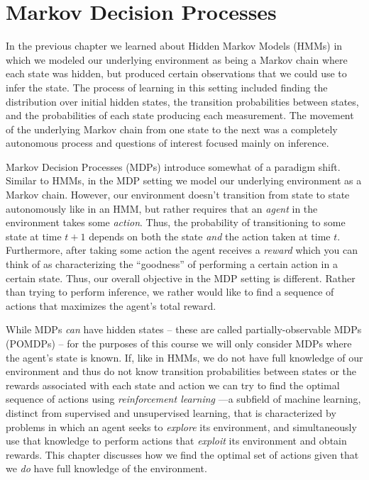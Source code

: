 \chapter{Markov Decision Processes}
In the previous chapter we learned about Hidden Markov Models (HMMs) in which we modeled our underlying environment as being a Markov chain where each state was hidden, but produced certain observations that we could use to infer the state. The process of learning in this setting included finding the distribution over initial hidden states, the transition probabilities between states, and the probabilities of each state producing each measurement. The movement of the underlying Markov chain from one state to the next was a completely autonomous process and questions of interest focused mainly on inference.

Markov Decision Processes (MDPs) introduce somewhat of a paradigm shift. Similar to HMMs, in the MDP setting we model our underlying environment as a Markov chain. However, our environment doesn't transition from state to state autonomously like in an HMM, but rather requires that an \textit{agent} in the environment takes some \textit{action}. Thus, the probability of transitioning to some state at time $t + 1$ depends on both the state \textit{and} the action taken at time $t$. Furthermore, after taking some action the agent receives a \textit{reward} which you can think of as characterizing the ``goodness'' of performing a certain action in a certain state. Thus, our overall objective in the MDP setting is different. Rather than trying to perform inference, we rather would like to find a sequence of actions that maximizes the agent's total reward.

While MDPs \textit{can} have hidden states -- these are called partially-observable MDPs (POMDPs) -- for the purposes of this course we will only consider MDPs where the agent's state is known. If, like in HMMs, we do not have full knowledge of our environment and thus do not know transition probabilities between states or the rewards associated with each state and action we can try to find the optimal sequence of actions using \textit{reinforcement learning} ---a subfield of machine learning, distinct from supervised and unsupervised learning, that is characterized by problems in which an agent seeks to \textit{explore} its environment, and simultaneously use that knowledge to perform actions that \textit{exploit} its environment and obtain rewards. This chapter discusses how we find the optimal set of actions given that we \textit{do} have full knowledge of the environment.
\\

